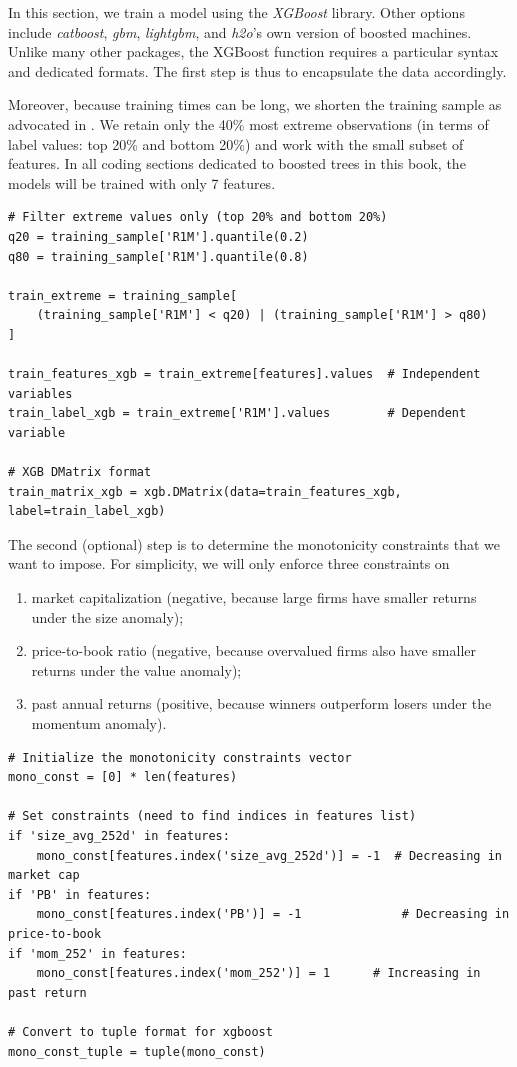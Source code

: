 In this section, we train a model using the \textit{XGBoost} library. Other options include \textit{catboost}, \textit{gbm}, \textit{lightgbm}, and \textit{h2o}'s own version of boosted machines. Unlike many other packages, the XGBoost function requires a particular syntax and dedicated formats. The first step is thus to encapsulate the data accordingly.

Moreover, because training times can be long, we shorten the training sample as advocated in \cite{coqueret2019training}. We retain only the 40\% most extreme observations (in terms of label values: top 20\% and bottom 20\%) and work with the small subset of features. In all coding sections dedicated to boosted trees in this book, the models will be trained with only 7 features.

\begin{verbatim}
# Filter extreme values only (top 20% and bottom 20%)
q20 = training_sample['R1M'].quantile(0.2)
q80 = training_sample['R1M'].quantile(0.8)

train_extreme = training_sample[
    (training_sample['R1M'] < q20) | (training_sample['R1M'] > q80)
]

train_features_xgb = train_extreme[features].values  # Independent variables
train_label_xgb = train_extreme['R1M'].values        # Dependent variable

# XGB DMatrix format
train_matrix_xgb = xgb.DMatrix(data=train_features_xgb, label=train_label_xgb)
\end{verbatim}

The second (optional) step is to determine the monotonicity constraints that we want to impose. For simplicity, we will only enforce three constraints on

\begin{enumerate}
\item market capitalization (negative, because large firms have smaller returns under the size anomaly);
\item price-to-book ratio (negative, because overvalued firms also have smaller returns under the value anomaly);
\item past annual returns (positive, because winners outperform losers under the momentum anomaly).
\end{enumerate}

\begin{verbatim}
# Initialize the monotonicity constraints vector
mono_const = [0] * len(features)

# Set constraints (need to find indices in features list)
if 'size_avg_252d' in features:
    mono_const[features.index('size_avg_252d')] = -1  # Decreasing in market cap
if 'PB' in features:
    mono_const[features.index('PB')] = -1              # Decreasing in price-to-book
if 'mom_252' in features:
    mono_const[features.index('mom_252')] = 1      # Increasing in past return

# Convert to tuple format for xgboost
mono_const_tuple = tuple(mono_const)
\end{verbatim}

